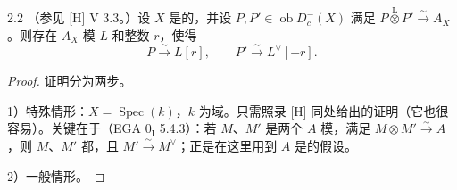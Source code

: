 \begin{SGAresult}{}{2.2}
（参见 [H] V 3.3。）设 $X$ 是的，并设 $P,P'\in\operatorname{ob}D_c^-(X)$ 满足 $P\mathbin{\overset{\mathrm L}{\otimes}}P'\xrightarrow{\sim}A_X$。则存在 $A_X$ 模 $L$ 和整数 $r$，使得
\[
 P\xrightarrow{\sim}L[r],\qquad P'\xrightarrow{\sim}L^\vee[-r].
\]
\end{SGAresult}
\begin{proof}
证明分为两步。

1）特殊情形：$X=\operatorname{Spec}(k)$，$k$ 为域。只需照录 [H] 同处给出的证明（它也很容易）。关键在于（EGA $0_{\mathrm I}$ 5.4.3）：若 $M$、$M'$ 是两个 $A$ 模，满足 $M\otimes M'\xrightarrow{\sim}A$，则 $M$、$M'$ 都，且 $M'\xrightarrow{\sim}M^\vee$；正是在这里用到 $A$ 是的假设。

2）一般情形。


\end{proof}
